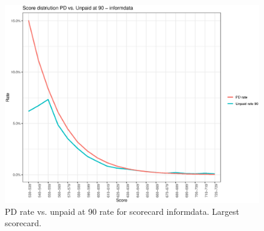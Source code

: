 
\begin{figure}[!ht]
  \centering
  \includegraphics[width=5in,trim={0 0 0 0},clip]{content/figures/scdist_dev_informdata.eps} 
  \caption{PD rate vs. unpaid at 90 rate for scorecard informdata. Largest scorecard.}
  \label{fig:scdist_dev_informdata}
\end{figure}

